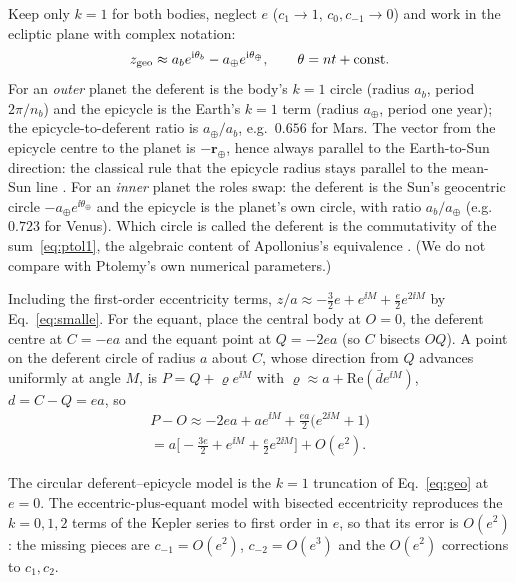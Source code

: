 Keep only $k=1$ for both bodies, neglect $e$ ($c_1\to1$, $c_0,c_{-1}\to0$) and
work in the ecliptic plane with complex notation:
\begin{equation}
z_{\rm geo}\approx a_be^{\mathrm{i}\theta_b}-a_\oplus e^{\mathrm{i}\theta_\oplus},\qquad
\theta=nt+\mathrm{const}.
\label{eq:ptol1}
\end{equation}
For an \emph{outer} planet the deferent is the body's $k=1$ circle (radius
$a_b$, period $2\pi/n_b$) and the epicycle is the Earth's $k=1$ term (radius
$a_\oplus$, period one year); the epicycle-to-deferent ratio is
$a_\oplus/a_b$, e.g.\ $0.656$ for Mars. The vector from the epicycle centre to
the planet is $-\mathbf r_\oplus$, hence always parallel to the Earth-to-Sun
direction: the classical rule that the epicycle radius stays parallel to the
mean-Sun line \cite{Neugebauer1975,Evans1998}. For an \emph{inner} planet the
roles swap: the deferent is the Sun's geocentric circle $-a_\oplus
e^{\ii\theta_\oplus}$ and the epicycle is the planet's own circle, with ratio
$a_b/a_\oplus$ (e.g.\ $0.723$ for Venus). Which circle is called the deferent
is the commutativity of the sum~\eqref{eq:ptol1}, the algebraic content of
Apollonius's equivalence \cite{Neugebauer1975,Evans1998}. (We do not compare
with Ptolemy's own numerical parameters.)

Including the first-order eccentricity terms, $z/a\approx-\tfrac32e+e^{\ii M}
+\tfrac e2e^{2\ii M}$ by Eq.~\eqref{eq:smalle}. For the equant, place the central body at
$O=0$, the deferent centre at $C=-ea$ and the equant point at $Q=-2ea$
(so $C$ bisects $OQ$). A point on the deferent circle of radius $a$ about
$C$, whose direction from $Q$ advances uniformly at angle $M$, is
$P=Q+\varrho e^{\ii M}$ with $\varrho\approx a+\mathrm{Re}(\bar d e^{\ii M})$,
$d=C-Q=ea$, so
\begin{multline}
P-O\approx-2ea+ae^{\ii M}+\tfrac{ea}{2}\big(e^{2\ii M}+1\big)\\
=a\Big[-\tfrac{3e}{2}+e^{\ii M}+\tfrac e2e^{2\ii M}\Big]+O(e^2).
\label{eq:equant}
\end{multline}

\begin{proposition}
\label{prop:ptol}
The circular deferent--epicycle model is the $k=1$ truncation of
Eq.~\eqref{eq:geo} at $e=0$. The eccentric-plus-equant model with bisected
eccentricity reproduces the $k=0,1,2$ terms of the Kepler series to first
order in $e$, so that its error is $O(e^2)$: the missing pieces are
$c_{-1}=O(e^2)$, $c_{-2}=O(e^3)$ and the $O(e^2)$ corrections to $c_1,c_2$.
\end{proposition}

